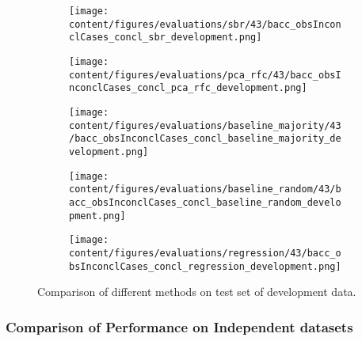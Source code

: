 \begin{figure}[t]
  \begin{subfigure}{0.5\textwidth}
    \centering
    \texttt{[image: content/figures/evaluations/sbr/43/bacc\_obsInconclCases\_concl\_sbr\_development.png]}
  \end{subfigure}
  \hfill
  \begin{subfigure}{0.5\textwidth}
    \centering
    \texttt{[image: content/figures/evaluations/pca\_rfc/43/bacc\_obsInconclCases\_concl\_pca\_rfc\_development.png]}
  \end{subfigure}
  \hfill
  \begin{subfigure}{0.5\textwidth}
    \centering
    \texttt{[image: content/figures/evaluations/baseline\_majority/43/bacc\_obsInconclCases\_concl\_baseline\_majority\_development.png]}
  \end{subfigure}
  \hfill
  \begin{subfigure}{0.5\textwidth}
    \centering
    \texttt{[image: content/figures/evaluations/baseline\_random/43/bacc\_obsInconclCases\_concl\_baseline\_random\_development.png]}
  \end{subfigure}
  \hfill
  \begin{subfigure}{0.5\textwidth}
    \centering
    \texttt{[image: content/figures/evaluations/regression/43/bacc\_obsInconclCases\_concl\_regression\_development.png]}
  \end{subfigure}

  \caption{Comparison of different methods on test set of development data.}
  \label{fig:test_dev}
\end{figure}



\subsubsection{Comparison of Performance on Independent datasets}
\label{subsubsec:perf_comp_indep}




